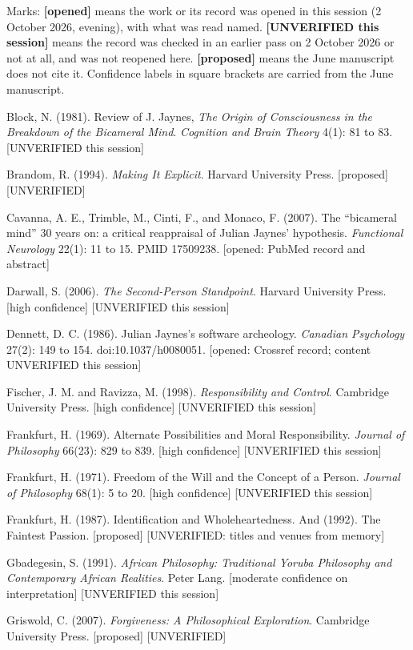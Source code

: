 \documentclass[11pt]{article}
\begin{document}
Marks: \textbf{[opened]} means the work or its record was opened in this session (2 October 2026, evening), with what was read named. \textbf{[UNVERIFIED this session]} means the record was checked in an earlier pass on 2 October 2026 or not at all, and was not reopened here. \textbf{[proposed]} means the June manuscript does not cite it. Confidence labels in square brackets are carried from the June manuscript.

Block, N. (1981). Review of J. Jaynes, \emph{The Origin of Consciousness in the Breakdown of the Bicameral Mind}. \emph{Cognition and Brain Theory} 4(1): 81 to 83. [UNVERIFIED this session]

Brandom, R. (1994). \emph{Making It Explicit}. Harvard University Press. [proposed] [UNVERIFIED]

Cavanna, A. E., Trimble, M., Cinti, F., and Monaco, F. (2007). The ``bicameral mind'' 30 years on: a critical reappraisal of Julian Jaynes' hypothesis. \emph{Functional Neurology} 22(1): 11 to 15. PMID 17509238. [opened: PubMed record and abstract]

Darwall, S. (2006). \emph{The Second-Person Standpoint}. Harvard University Press. [high confidence] [UNVERIFIED this session]

Dennett, D. C. (1986). Julian Jaynes's software archeology. \emph{Canadian Psychology} 27(2): 149 to 154. doi:10.1037/\allowbreak{}h0080051. [opened: Crossref record; content UNVERIFIED this session]

Fischer, J. M. and Ravizza, M. (1998). \emph{Responsibility and Control}. Cambridge University Press. [high confidence] [UNVERIFIED this session]

Frankfurt, H. (1969). Alternate Possibilities and Moral Responsibility. \emph{Journal of Philosophy} 66(23): 829 to 839. [high confidence] [UNVERIFIED this session]

Frankfurt, H. (1971). Freedom of the Will and the Concept of a Person. \emph{Journal of Philosophy} 68(1): 5 to 20. [high confidence] [UNVERIFIED this session]

Frankfurt, H. (1987). Identification and Wholeheartedness. And (1992). The Faintest Passion. [proposed] [UNVERIFIED: titles and venues from memory]

Gbadegesin, S. (1991). \emph{African Philosophy: Traditional Yoruba Philosophy and Contemporary African Realities}. Peter Lang. [moderate confidence on interpretation] [UNVERIFIED this session]

Griswold, C. (2007). \emph{Forgiveness: A Philosophical Exploration}. Cambridge University Press. [proposed] [UNVERIFIED]
\end{document}
